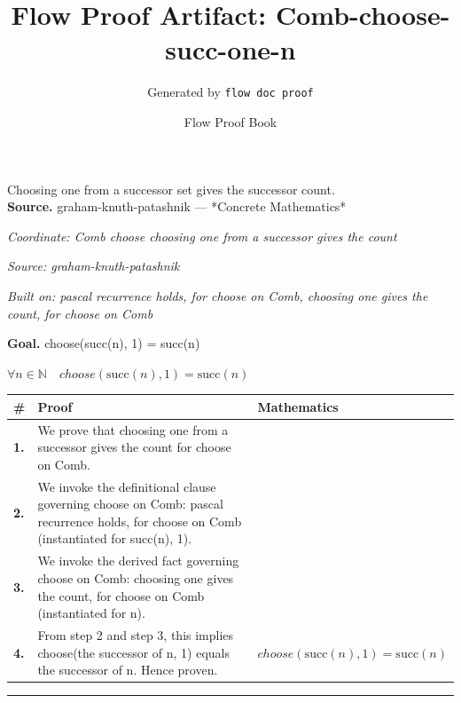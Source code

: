 \documentclass[11pt]{article}
\title{Flow Proof Artifact: Comb-choose-succ-one-n}
\author{Generated by \texttt{flow doc proof}}
\date{Flow Proof Book}
\theoremstyle{definition}
\begin{document}
\maketitle
Choosing one from a successor set gives the successor count.\\[0.5em]
\textbf{Source.} graham-knuth-patashnik — *Concrete Mathematics*\\[0.5em]
\bigskip
{}\par
\smallskip\noindent\textit{Coordinate: Comb \cdot choose \cdot choosing one from a successor gives the count}\par
\smallskip\noindent\textit{Source: graham-knuth-patashnik}\par
\smallskip\noindent\textit{Built on: pascal recurrence holds, for choose on Comb, choosing one gives the count, for choose on Comb}\par
\medskip
\noindent\textbf{Goal.} choose(succ(n), 1) = succ(n)\par
\noindent$\displaystyle \forall n \in \mathbb{N}\quad choose(\mathrm{succ}(n), 1) = \mathrm{succ}(n)$\par
\medskip
\noindent
\begin{tabular}{@{} >{\raggedright\arraybackslash}p{} >{\raggedright\arraybackslash}p{} >{\raggedleft\arraybackslash}p{} @{}}
\textbf{\#} & \textbf{Proof} & \textbf{Mathematics} \\
\midrule
\textbf{1.} & We prove that choosing one from a successor gives the count for choose on Comb. & \\[0.45em]
\textbf{2.} & We invoke the definitional clause governing choose on Comb: pascal recurrence holds, for choose on Comb (instantiated for succ(n), 1). & \\[0.45em]
\textbf{3.} & We invoke the derived fact governing choose on Comb: choosing one gives the count, for choose on Comb (instantiated for n). & \\[0.45em]
\textbf{4.} & From step 2 and step 3, this implies choose(the successor of n, 1) equals the successor of n. Hence proven. & $\displaystyle choose(\mathrm{succ}(n), 1) = \mathrm{succ}(n)$ \\[0.45em]
\bottomrule
\end{tabular}
\label{thm:Comb-choose-choosing_one_from_a_successor_gives_the_count}
\par\medskip\hrule
\end{document}
